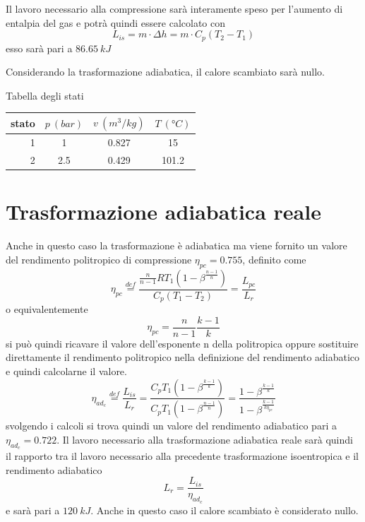 \documentclass[a4paper,12pt]{article}
\begin{document}
Il lavoro necessario alla compressione sarà interamente speso per l'aumento di entalpia del gas
e potrà quindi essere calcolato con
\begin{equation}
    L_{is} = m\cdot \Delta h = m\cdot C_p (T_2 - T_1)
\end{equation}
esso sarà pari a $86.65\ kJ$

Considerando la trasformazione adiabatica, il calore scambiato sarà nullo.

Tabella degli stati

\begin{center}
    \begin{tabular}{r|c|c|c}
        stato    & $p\ (bar)$ & $v\ (m^3/kg)$ & $T\ (\text{°}C) $\\ \hline
        1   &           1 &          0.827    &           15     \\ \hline
        2   &         2.5 &          0.429    &           101.2
    \end{tabular}
\end{center}

\section{Trasformazione adiabatica reale}
\label{sec:seconda_trasformazione}
Anche in questo caso la trasformazione è adiabatica ma viene fornito un valore del rendimento
politropico di compressione $\eta_{pc} = 0.755$, definito come
\begin{equation}
    \label{eq:rendimento_politropica}
    \eta_{pc} \stackrel{def}{=} \frac{\displaystyle\frac{n}{n-1} R T_1 \left(1-\beta^{\displaystyle\frac{n-1}{n}} \right)}{C_p \left(T_1 - T_2\right)}
    = \frac{L_{pc}}{L_r}
\end{equation}
o equivalentemente 
\begin{equation}
    \label{eq:rendimento_politropica_breve}
    \eta_{pc} = \frac{n}{n-1} \frac{k-1}{k}
\end{equation}
si può quindi ricavare il valore dell'esponente n della politropica oppure sostituire direttamente
il rendimento politropico nella definizione del rendimento adiabatico e quindi calcolarne il valore.
\begin{equation}
    \label{eq:rendimento_compressione_adiabatico}
    \eta_{ad_c} \stackrel{def}{=} \frac{L_{is}}{L_r} = \frac{ C_p T_1 \left(1-\beta^{\displaystyle\frac{k-1}{k}}\right)}
    {C_p T_1 \left(1-\beta^{\displaystyle\frac{n-1}{n}}\right)} = \frac{1-\beta^{\displaystyle\frac{k-1}{k}}}{1-\beta^{\displaystyle\frac{k-1}{k\eta_{pc}}}}
\end{equation}
svolgendo i calcoli si trova quindi un valore del rendimento adiabatico pari a $\eta_{ad_c}=0.722$.
Il lavoro necessario alla trasformazione adiabatica reale sarà quindi il rapporto tra il lavoro necessario
alla precedente trasformazione isoentropica e il rendimento adiabatico
\begin{equation*}
    L_r = \frac{L_{is}}{\eta_{ad_c}}
\end{equation*}
e sarà pari a $120\ kJ$.
Anche in questo caso il calore scambiato è considerato nullo.
\end{document}
